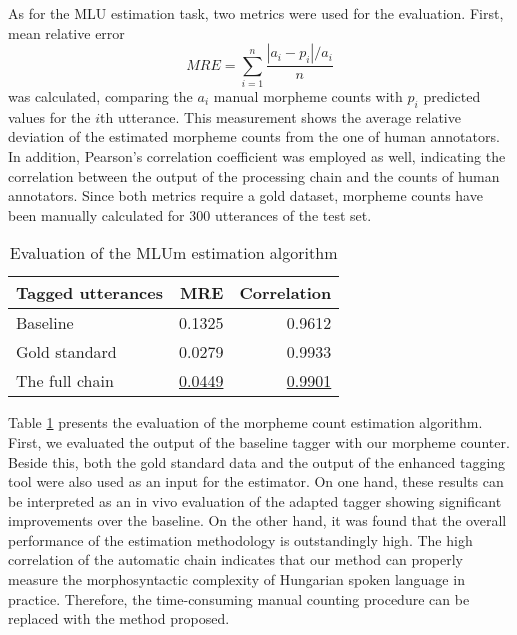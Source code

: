As for the MLU estimation task, two metrics were used for the evaluation. 
First, mean relative error
\begin{equation}
MRE = \sum_{i=1}^n \frac{|a_i-p_i|/a_i}{n}
\end{equation}
was calculated, comparing the $a_i$ manual morpheme counts with $p_i$ predicted values for the $i$th utterance. 
This measurement shows the average relative deviation of the estimated morpheme counts from the one of human annotators. 
In addition, Pearson's correlation coefficient was employed as well, indicating the correlation between the output of the processing chain and the counts of human annotators. 
Since both metrics require a gold dataset, morpheme counts have been manually calculated for 300 utterances of the test set.


\begin{table}
\centering
\caption{Evaluation of the MLUm estimation algorithm}
\label{tab:eval_est}
\begin{tabular}{ l r r} 
\hline
Tagged utterances & MRE & Correlation \\
\hline
Baseline &  0.1325  &  0.9612 \\
Gold standard &  0.0279 &  0.9933 \\
The full chain & \underline{0.0449} & \underline{0.9901} \\
\hline
\end{tabular}
\end{table}

Table \ref{tab:eval_est} presents the evaluation of the morpheme count estimation algorithm. 
First, we evaluated the output of the baseline tagger with our morpheme counter. 
Beside this, both the gold standard data and the output of the enhanced tagging tool were also used as an input for the estimator. %
On one hand, these results can be interpreted as an in vivo evaluation of the adapted tagger showing significant improvements over the baseline.
On the other hand, it was found that the overall performance of the estimation methodology is outstandingly high.  
The high correlation of the automatic chain indicates that our method can properly measure the morphosyntactic complexity of Hungarian spoken language in practice. 
Therefore, the time-consuming manual counting procedure can be replaced with the method proposed.